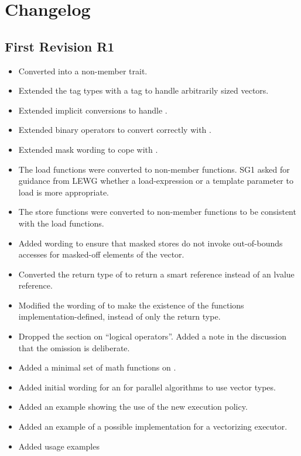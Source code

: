 \section{Changelog}
\subsection{First Revision R1}
\begingroup
  \newcommand\chck{\item[\ensuremath{\checkmark}]}
  \begin{itemize}
      \chck Converted  into a non-member trait.
      \chck Extended the  tag types with a  tag to handle arbitrarily sized vectors.
      \chck Extended implicit conversions to handle \fixedsizeN.
      \chck Extended binary operators to convert correctly with \fixedsizeN.
    \item Extended mask wording to cope with \fixedsizeN.
    \item The load functions were converted to non-member functions.
      SG1 asked for guidance from LEWG whether a load-expression or a template parameter to load is more appropriate.
    \item The store functions were converted to non-member functions to be consistent with the load functions.
    \item Added wording to ensure that masked stores do not invoke out-of-bounds accesses for masked-off elements of the vector.
    \item Converted the return type of \datapar{} to return a smart reference instead of an lvalue reference.
    \item Modified the wording of  to make the existence of the functions implementation-defined, instead of only the return type.
    \item Dropped the section on “\datapar logical operators”. Added a note in the discussion that the omission is deliberate.
    \item Added a minimal set of math functions on \datapar.
    \item Added initial wording for an  for parallel algorithms to use vector types.
    \item Added an example showing the use of the new execution policy.
    \item Added an example of a possible  implementation for a vectorizing executor.
    \item Added usage examples
  \end{itemize}
\endgroup





